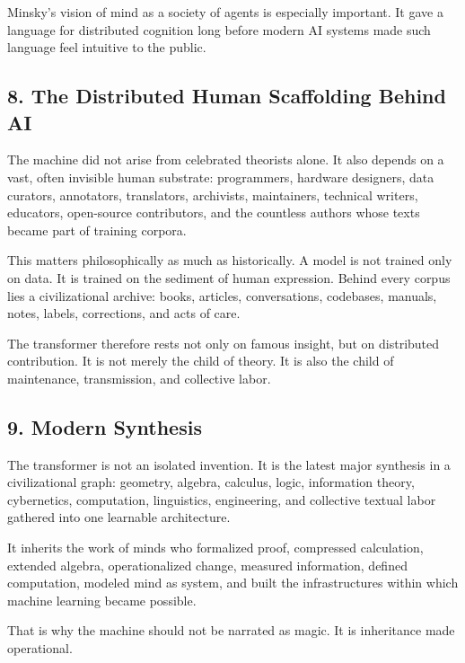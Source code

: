Minsky's vision of mind as a society of agents is especially important.
It gave a language for distributed cognition long before modern AI
systems made such language feel intuitive to the public.

\hypertarget{the-distributed-human-scaffolding-behind-ai}{%
\subsection{8. The Distributed Human Scaffolding Behind
AI}\label{the-distributed-human-scaffolding-behind-ai}}

The machine did not arise from celebrated theorists alone. It also
depends on a vast, often invisible human substrate: programmers,
hardware designers, data curators, annotators, translators, archivists,
maintainers, technical writers, educators, open-source contributors, and
the countless authors whose texts became part of training corpora.

This matters philosophically as much as historically. A model is not
trained only on data. It is trained on the sediment of human expression.
Behind every corpus lies a civilizational archive: books, articles,
conversations, codebases, manuals, notes, labels, corrections, and acts
of care.

The transformer therefore rests not only on famous insight, but on
distributed contribution. It is not merely the child of theory. It is
also the child of maintenance, transmission, and collective labor.

\hypertarget{modern-synthesis}{%
\subsection{9. Modern Synthesis}\label{modern-synthesis}}

The transformer is not an isolated invention. It is the latest major
synthesis in a civilizational graph: geometry, algebra, calculus, logic,
information theory, cybernetics, computation, linguistics, engineering,
and collective textual labor gathered into one learnable architecture.

It inherits the work of minds who formalized proof, compressed
calculation, extended algebra, operationalized change, measured
information, defined computation, modeled mind as system, and built the
infrastructures within which machine learning became possible.

That is why the machine should not be narrated as magic. It is
inheritance made operational.

